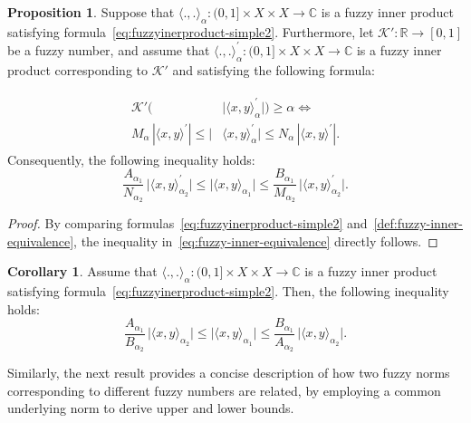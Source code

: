 \documentclass[preprint,12pt]{elsarticle}
\theoremstyle{definition}
\newtheorem{proposition}{Proposition}[section]
\newtheorem{corollary}[theorem]{Corollary}
\begin{document}
\begin{proposition}
	Suppose that $ \langle ., . \rangle_{\alpha}:(0,1]\times X\times X \to \mathbb{C}$ is a fuzzy inner product satisfying formula~\eqref{eq:fuzzyinerproduct-simple2}.  
	Furthermore, let $\mathcal{K}':\mathbb{R} \to [0,1]$ be a fuzzy number, and assume that 
	$ \langle ., . \rangle^\prime_{\alpha}:(0,1]\times X\times X \to \mathbb{C}$ is a fuzzy inner product corresponding to $\mathcal{K}'$ and satisfying the following formula:
	
	\begin{align}\label{def:fuzzy-inner-equivalence}		
		\begin{split}
			\mathcal{K}'\bigl(&\big|\langle x, y \rangle^\prime_\alpha \big|\bigr) \geq \alpha 
			\Leftrightarrow\\ 
			M_\alpha\, |\langle x,y\rangle^{\prime}|\leq \big|&\langle x, y \rangle^\prime_\alpha \big|
			\leq N_\alpha\, |\langle x,y\rangle^{\prime}|.
		\end{split}
	\end{align}
	Consequently, the following inequality holds:
	\begin{equation}\label{eq:fuzzy-inner-equivalence}
		\frac{A_{\alpha_1}}{N_{\alpha_2}}\, \big|\langle x, y \rangle^\prime_{\alpha_2} \big|
		\leq \big|\langle x, y \rangle_{\alpha_1} \big|
		\leq \frac{B_{\alpha_1}}{M_{\alpha_2}}\, \big|\langle x, y \rangle^\prime_{\alpha_2} \big|.
	\end{equation}
\end{proposition}

\begin{proof}
	By comparing formulas~\eqref{eq:fuzzyinerproduct-simple2} and~\eqref{def:fuzzy-inner-equivalence}, the inequality in~\eqref{eq:fuzzy-inner-equivalence} directly follows.
\end{proof}
\begin{corollary}
	Assume that $\langle ., . \rangle_{\alpha}:(0,1]\times X\times X \to \mathbb{C}$ is a fuzzy inner product satisfying formula~\eqref{eq:fuzzyinerproduct-simple2}. 
	Then, the following inequality holds:
	\begin{equation}
		\frac{A_{\alpha_1}}{B_{\alpha_2}} \, \big|\langle x, y \rangle_{\alpha_2} \big|
		\leq \big|\langle x, y \rangle_{\alpha_1} \big|
		\leq \frac{B_{\alpha_1}}{A_{\alpha_2}} \, \big|\langle x, y \rangle_{\alpha_2} \big|.
	\end{equation}
	
\end{corollary}
Similarly, the next result provides a concise description of how two fuzzy norms 
corresponding to different fuzzy numbers are related, by employing a common 
underlying norm to derive upper and lower bounds.
\end{document}
